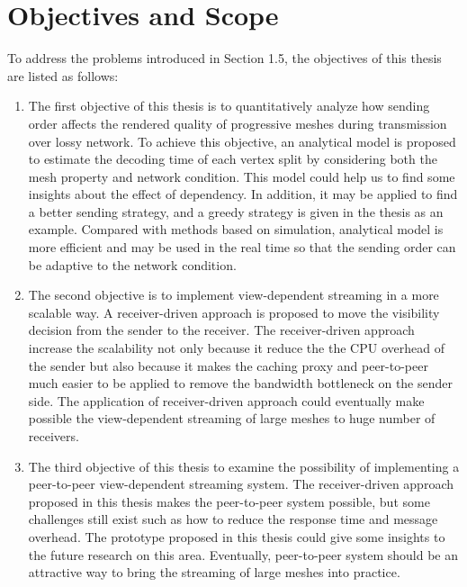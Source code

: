 \documentclass[11pt, a4paper]{report}
\begin{document}
    \section{Objectives and Scope}
    \label{s:intro:objectives}
    To address the problems introduced in Section 1.5, 
    the objectives of this thesis are listed as follows: 
    \begin{enumerate}
        \item The first objective of this thesis is
            to quantitatively analyze how sending order affects
            the rendered quality of progressive meshes 
            during transmission over lossy network. 
            To achieve this objective, 
            an analytical model is proposed
            to estimate the decoding time of
            each vertex split by considering both
            the mesh property and network condition. 
            This model could help us to find some insights
            about the effect of dependency. 
            In addition, it may be applied to find a better sending strategy, 
            and a greedy strategy is given in the thesis as an example. 
            Compared with methods based on simulation, 
            analytical model is more efficient and may be used
            in the real time so that the sending order
            can be adaptive to the network condition.
        \item The second objective is to implement view-dependent streaming
            in a more scalable way. A receiver-driven approach is proposed 
            to move the visibility decision from the sender to the receiver.
            The receiver-driven approach increase the scalability
            not only because it reduce the the CPU overhead of the sender 
            but also because it makes the caching proxy and peer-to-peer much easier
            to be applied to remove the bandwidth bottleneck on the sender side.
            The application of receiver-driven approach could eventually
            make possible the view-dependent streaming of large meshes
            to huge number of receivers.
        \item The third objective of this thesis to examine the possibility 
            of implementing a peer-to-peer view-dependent streaming system. 
            The receiver-driven approach proposed in this thesis 
            makes the peer-to-peer system possible, 
            but some challenges still exist such as how to reduce the response time
            and message overhead. 
            The prototype proposed in this thesis could give some insights
            to the future research on this area. 
            Eventually, peer-to-peer system should be an attractive way 
            to bring the streaming of large meshes into practice. 
    \end{enumerate}
\end{document}
